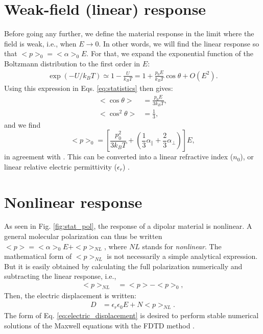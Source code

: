 \documentclass[12pt,letterpaper]{article}
\begin{document}
\section{Weak-field (linear) response}\label{weak_field}
Before going any further, we define the material response in the limit where the field is weak, i.e., when $E\rightarrow 0$. In other words, we will find the linear response so that $<p>_0=<\alpha>_0 E$. For that, we expand the exponential function of the Boltzmann distribution to the first order in $E$:
\begin{align}\label{eq:exponential_first_order}
  \exp(-U/k_BT)\simeq 1-\frac{U}{k_BT} = 1+\frac{p_0E}{k_BT}\cos\theta + O(E^2).
\end{align}
Using this expression in Eqs. \eqref{eq:statistics} then gives:
\begin{subequations}\label{eq:statistics_weak_field}
 \begin{align}
  <\cos\theta>&=\frac{p_0 E}{3k_BT},\\
  <\cos^2\theta>&=\frac{1}{3},
 \end{align}
\end{subequations}
and we find
\begin{equation}\label{eq:total_pol_weak_field}
 <p>_0=\left[\frac{p_0^2 }{3k_BT}+\left(\frac{1}{3}\alpha_\parallel + \frac{2}{3}\alpha_\bot\right)\right] E,
\end{equation}
in agreement with \cite{jackson1999,hook1991,boyd2008,bonin1997}. This can be converted into a linear refractive index ($n_0$), or linear relative electric permittivity ($\epsilon_r$) \cite{boyd2008}.

\section{Nonlinear response}\label{non_linear}
As seen in Fig. \ref{fig:stat_pol}, the response of a dipolar material is nonlinear. A general molecular polarization can thus be written $<p>=<\alpha>_0E + <p>_{NL}$, where $NL$ stands for \textit{nonlinear}. The mathematical form of $<p>_{NL}$ is not necessarily a simple analytical expression. But it is easily obtained by calculating the full polarization numerically and subtracting the linear response, i.e., 
\begin{align}\label{eq:non_linear_pol}
 <p>_{NL} &= <p> - <p>_0,
\end{align}
Then, the electric displacement is written:
\begin{align}\label{eq:electric_displacement}
 D &= \epsilon_r\epsilon_0 E + N<p>_{NL}.
\end{align}
The form of Eq. \eqref{eq:electric_displacement} is desired to perform stable numerical solutions of the Maxwell equations with the FDTD method \cite{sullivan2000,taflove2005}.
\end{document}
